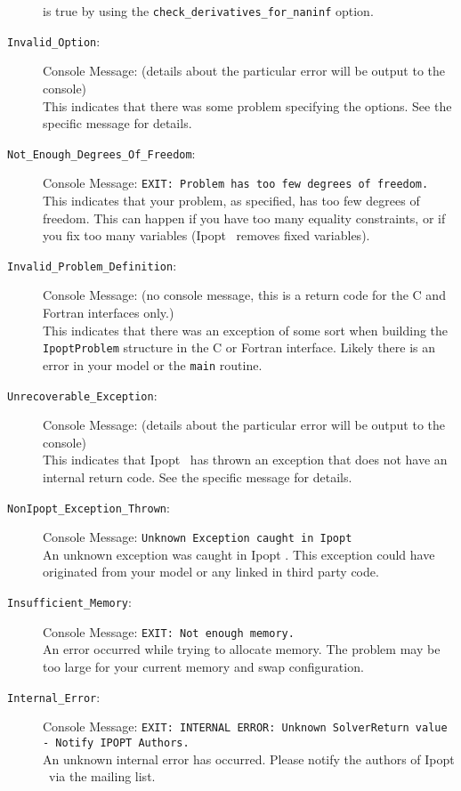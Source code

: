 \documentclass[10pt]{article}
\newcommand{\Ipopt}{{\sc Ipopt }}
\begin{document}
\begin{description}
  is true by using the {\tt check\_derivatives\_for\_naninf} option.
\item[{\tt Invalid\_Option}:]  $\;$ \\
  Console Message: (details about the particular error
  will be output to the console) \\
  This indicates that there was some problem specifying the options.
  See the specific message for details.
\item[{\tt Not\_Enough\_Degrees\_Of\_Freedom}:]  $\;$ \\
  Console Message: {\tt EXIT: Problem has too few degrees of freedom.} \\
  This indicates that your problem, as specified, has too few degrees
  of freedom. This can happen if you have too many equality
  constraints, or if you fix too many variables (\Ipopt\ removes fixed
  variables).
\item[{\tt Invalid\_Problem\_Definition}:]  $\;$ \\
  Console Message: (no console message, this is a return code for the
  C and Fortran interfaces only.) \\
  This indicates that there was an exception of some sort when
  building the {\tt IpoptProblem} structure in the C or Fortran
  interface. Likely there is an error in your model or the {\tt main}
  routine.
\item[{\tt Unrecoverable\_Exception}:]  $\;$ \\
  Console Message: (details about the particular error
  will be output to the console) \\
  This indicates that \Ipopt\ has thrown an exception that does not
  have an internal return code. See the specific message for details.
\item[{\tt NonIpopt\_Exception\_Thrown}:]  $\;$ \\
  Console Message: {\tt Unknown Exception caught in Ipopt} \\
  An unknown exception was caught in \Ipopt. This exception could have
  originated from your model or any linked in third party code.
\item[{\tt Insufficient\_Memory}:]  $\;$ \\
  Console Message: {\tt EXIT: Not enough memory.} \\
  An error occurred while trying to allocate memory. The problem may
  be too large for your current memory and swap configuration.
\item[{\tt Internal\_Error}:]  $\;$ \\
  Console Message: {\tt EXIT: INTERNAL ERROR: Unknown SolverReturn
    value - Notify IPOPT Authors.} \\
  An unknown internal error has occurred. Please notify the authors of
  \Ipopt\ via the mailing list.

\end{description}
\end{document}
